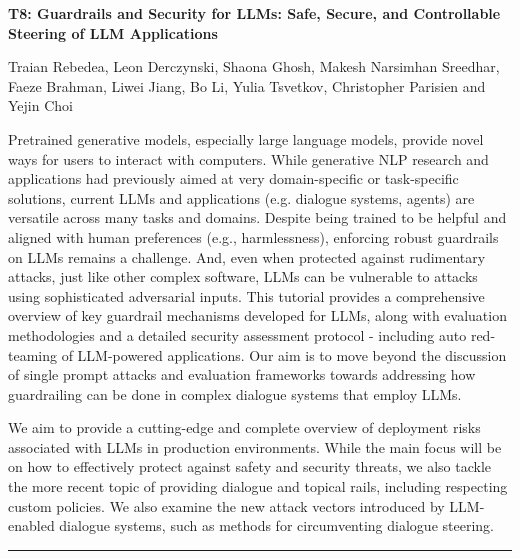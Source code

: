 \begin{center}
    \Large{\textbf{T8: Guardrails and Security for LLMs: Safe, Secure, and Controllable Steering of LLM Applications}\\}
    \par\bigskip
    \large{Traian Rebedea, Leon Derczynski, Shaona Ghosh, Makesh Narsimhan Sreedhar,
Faeze Brahman, Liwei Jiang, Bo Li, Yulia Tsvetkov, Christopher Parisien and Yejin Choi}\\
    \par\bigskip

\end{center}

Pretrained generative models, especially large language models, provide novel ways for users to interact with computers. While generative NLP research and applications had previously aimed at very domain-specific or task-specific solutions, current LLMs and applications (e.g. dialogue systems, agents) are versatile across many tasks and domains. Despite being trained to be helpful and aligned with human preferences (e.g., harmlessness), enforcing robust guardrails on LLMs remains a challenge. And, even when protected against rudimentary attacks, just like other complex software, LLMs can be vulnerable to attacks using sophisticated adversarial inputs. This tutorial provides a comprehensive overview of key guardrail mechanisms developed for LLMs, along with evaluation methodologies and a detailed security assessment protocol - including auto red-teaming of LLM-powered applications. Our aim is to move beyond the discussion of single prompt attacks and evaluation frameworks towards addressing how guardrailing can be done in complex dialogue systems that employ LLMs.

We aim to provide a cutting-edge and complete overview of deployment risks associated with LLMs in production environments. While the main focus will be on how to effectively protect against safety and security threats, we also tackle the more recent topic of providing dialogue and topical rails, including respecting custom policies. We also examine the new attack vectors introduced by LLM-enabled dialogue systems, such as methods for circumventing dialogue steering.
\begin{center}
    \noindent\rule{200px}{1pt}
\end{center}
